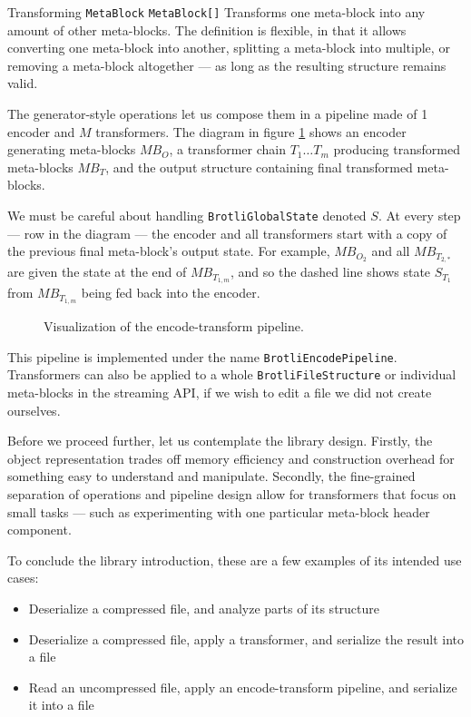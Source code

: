 \documentclass[english,master,dept460,male,cpp,cpdeclaration]{diploma}
\newcommand{\nosep}{\itemsep0em}
\newcommand{\tikzfigure}[1]{
	\tikzsetnextfilename{#1}%
}
\begin{document}
\brotlioperationdesc
{Transforming}
{\verb|MetaBlock|}
{\verb|MetaBlock[]|}
{Transforms one meta-block into any amount of other meta-blocks. The definition is flexible, in that it allows converting one meta-block into another, splitting a meta-block into multiple, or removing a meta-block altogether --- as long as the resulting structure remains valid.}

\smallskip
\noindent
The generator-style operations let us compose them in a pipeline made of 1 encoder and $M$ transformers. The diagram in figure \ref{fig:encode-transform-pipeline} shows an encoder generating meta-blocks $\mathit{MB}_O$, a transformer chain $T_1\ldots T_m$ producing transformed meta-blocks $\mathit{MB}_T$, and the output structure containing final transformed meta-blocks.

We must be careful about handling \verb|BrotliGlobalState| denoted $S$. At every step --- row in the diagram --- the encoder and all transformers start with a copy of the previous final meta-block's output state. For example, $\textit{MB}_{O_2}$ and all $\textit{MB}_{T_{2,*}}$ are given the state at the end of $\textit{MB}_{T_{1,m}}$, and so the dashed line shows state $S_{T_1}$ from $\textit{MB}_{T_{1,m}}$ being fed back into the encoder.

\begin{figure}[H]
	\centering
	\medskip
	\tikzfigure{encode-transform-pipeline}
	\caption{Visualization of the encode-transform pipeline.}
	\label{fig:encode-transform-pipeline}
\end{figure}

\noindent
This pipeline is implemented under the name \verb|BrotliEncodePipeline|. Transformers can also be applied to a whole \verb|BrotliFileStructure| or individual meta-blocks in the streaming API, if we wish to edit a file we did not create ourselves.

Before we proceed further, let us contemplate the library design. Firstly, the object representation trades off memory efficiency and construction overhead for something easy to understand and manipulate. Secondly, the fine-grained separation of operations and pipeline design allow for transformers that focus on small tasks --- such as experimenting with one particular meta-block header component.

To conclude the library introduction, these are a few examples of its intended use cases:

\begin{itemize} \nosep
	\item Deserialize a compressed file, and analyze parts of its structure
	\item Deserialize a compressed file, apply a transformer, and serialize the result into a file
	\item Read an uncompressed file, apply an encode-transform pipeline, and serialize it into a file
\end{itemize}
\end{document}
